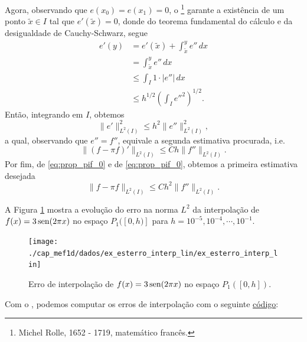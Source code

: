 \begin{dem}
Agora, observando que $e(x_0)=e(x_1)=0$, o \footnote{Michel Rolle, 1652 - 1719, matemático francês.} garante a existência de um ponto $\tilde{x}\in I$ tal que $e'(\tilde{x})=0$, donde do teorema fundamental do cálculo e da desigualdade de Cauchy-Schwarz, segue
\begin{align}
  e'(y) &= e'(\tilde{x}) + \int_{\tilde{x}}^y e''\,dx \\
        &= \int_{\tilde{x}}^y e''\,dx\\
        &\leq \int_{I}1\cdot |e''|\,dx\\
        &\leq h^{1/2}\left(\int_I e''^2\right)^{1/2}.
\end{align}
Então, integrando em $I$, obtemos
\begin{equation}\label{eq:prop_pif_1}
  \|e'\|_{L^2(I)}^2 \leq h^2\|e''\|_{L^2(I)}^2,
\end{equation}
a qual, observando que $e'' = f''$, equivale a segunda estimativa procurada, i.e.
\begin{equation}
  \|(f-\pi f)'\|_{L^2(I)} \leq C h \|f''\|_{L^2(I)}.
\end{equation}
Por fim, de \eqref{eq:prop_pif_0} e de \eqref{eq:prop_pif_0}, obtemos a primeira estimativa desejada
\begin{equation}
  \|f - \pi f\|_{L^2(I)} \leq C h^2 \|f''\|_{L^2(I)}.
\end{equation}
\end{dem}

\begin{ex}\label{ex:esterro_interp_lin}
  A Figura \ref{fig:ex_esterro_interp_lin} mostra a evolução do erro na norma $L^2$ da interpolação de $f(x)=3\operatorname{sen}(2\pi x)$ no espaço $P_1([0, h)]$ para $h=10^{-5}, 10^{-4}, \cdots, 10^{-1}$.

  \begin{figure}[h!]
    \centering
    \texttt{[image: ./cap\_mef1d/dados/ex\_esterro\_interp\_lin/ex\_esterro\_interp\_lin]}
    \caption{Erro de interpolação de $f(x)=3\operatorname{sen}(2\pi x)$ no espaço $P_1([0, h])$.}
    \label{fig:ex_esterro_interp_lin}
  \end{figure}

\ifispython
Com o \fenics, podemos computar os erros de interpolação com o seguinte \href{https://github.com/phkonzen/notas/blob/master/src/MetodoElementosFinitos/cap_mef1d/dados/ex_esterro_interp_lin/ex_esterro_interp_lin.py}{código}:

\fi
\end{ex}


